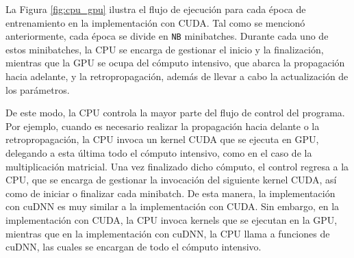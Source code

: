La Figura \ref{fig:cpu_gpu} ilustra el flujo de ejecución para cada época de entrenamiento en la implementación con CUDA. Tal como se mencionó anteriormente, cada época se divide en \texttt{NB} minibatches. Durante cada uno de estos minibatches, la CPU se encarga de gestionar el inicio y la finalización, mientras que la GPU se ocupa del cómputo intensivo, que abarca la propagación hacia adelante, y la retropropagación, además de llevar a cabo la actualización de los parámetros.

De este modo, la CPU controla la mayor parte del flujo de control del programa. Por ejemplo, cuando es necesario realizar la propagación hacia delante o la retropropagación, la CPU invoca un kernel CUDA que se ejecuta en GPU, delegando a esta última todo el cómputo intensivo, como en el caso de la multiplicación matricial. Una vez finalizado dicho cómputo, el control regresa a la CPU, que se encarga de gestionar la invocación del siguiente kernel CUDA, así como de iniciar o finalizar cada minibatch. De esta manera, la implementación con cuDNN es muy similar a la implementación con CUDA. Sin embargo, en la implementación con CUDA, la CPU invoca kernels que se ejecutan en la GPU, mientras que en la implementación con cuDNN, la CPU llama a funciones de cuDNN, las cuales se encargan de todo el cómputo intensivo.
